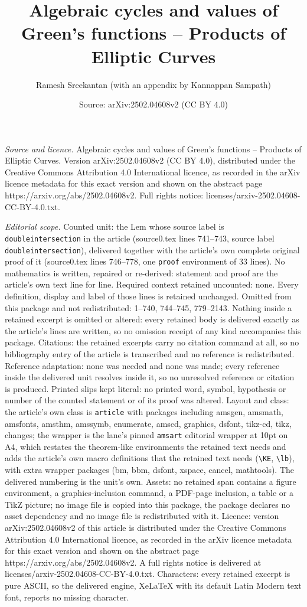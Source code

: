 \documentclass[10pt,a4paper]{amsart}
\title[Algebraic cycles and values of Green's functions -- Products]{Algebraic cycles and values of Green's functions -- Products of Elliptic Curves}
\author{Ramesh Sreekantan (with an appendix by Kannappan Sampath)}
\date{Source: arXiv:2502.04608v2 (CC BY 4.0)}
\begin{document}
\maketitle

\noindent\emph{Source and licence.} Algebraic cycles and values of Green's functions -- Products of Elliptic Curves. Version arXiv:2502.04608v2 (CC BY 4.0), distributed under the Creative Commons Attribution 4.0 International licence, as recorded in the arXiv licence metadata for this exact version and shown on the abstract page https://arxiv.org/abs/2502.04608v2. Full rights notice: licenses/arxiv-2502.04608-CC-BY-4.0.txt.\par\smallskip

\noindent\textit{Editorial scope.} Counted unit: the Lem whose source label is \texttt{doubleintersection} in the article (source0.tex lines 741--743, source label \texttt{doubleintersection}), delivered together with the article's own complete original proof of it (source0.tex lines 746--778, one \texttt{proof} environment of 33 lines). No mathematics is written, repaired or re-derived: statement and proof are the article's own text line for line. Required context retained uncounted: none. Every definition, display and label of those lines is retained unchanged. Omitted from this package and not redistributed: 1--740, 744--745, 779--2143. Nothing inside a retained excerpt is omitted or altered: every retained body is delivered exactly as the article's lines are written, so no omission receipt of any kind accompanies this package. Citations: the retained excerpts carry no citation command at all, so no bibliography entry of the article is transcribed and no reference is redistributed. Reference adaptation: none was needed and none was made; every reference inside the delivered unit resolves inside it, so no unresolved reference or citation is produced. Printed slips kept literal: no printed word, symbol, hypothesis or number of the counted statement or of its proof was altered. Layout and class: the article's own class is \texttt{article} with packages including amsgen, amsmath, amsfonts, amsthm, amssymb, enumerate, amscd, graphics, dsfont, tikz-cd, tikz, changes; the wrapper is the lane's pinned \texttt{amsart} editorial wrapper at 10pt on A4, which restates the theorem-like environments the retained text needs and adds the article's own macro definitions that the retained text needs (\texttt{\textbackslash KE}, \texttt{\textbackslash lb}), with extra wrapper packages (bm, bbm, dsfont, xspace, cancel, mathtools). The delivered numbering is the unit's own. Assets: no retained span contains a figure environment, a graphics-inclusion command, a PDF-page inclusion, a table or a TikZ picture; no image file is copied into this package, the package declares no asset dependency and no image file is redistributed with it. Licence: version arXiv:2502.04608v2 of this article is distributed under the Creative Commons Attribution 4.0 International licence, as recorded in the arXiv licence metadata for this exact version and shown on the abstract page https://arxiv.org/abs/2502.04608v2. A full rights notice is delivered at licenses/arxiv-2502.04608-CC-BY-4.0.txt. Characters: every retained excerpt is pure ASCII, so the delivered engine, XeLaTeX with its default Latin Modern text font, reports no missing character.
\end{document}
